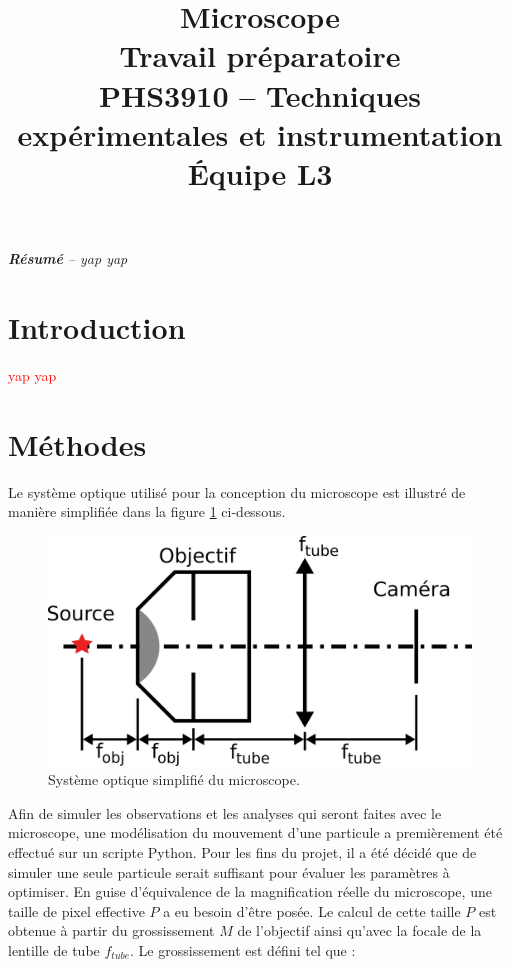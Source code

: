 \documentclass[conference]{IEEEtran}
\begin{document}
\title{Microscope\\
\large Travail préparatoire \\
PHS3910 -- Techniques expérimentales et instrumentation\\ 
Équipe L3}

\author{
\and
{}
\and
{}
\and
{}
}

\maketitle

\textit{\textbf{Résumé} -- yap yap}

\section{Introduction}


\textcolor{red}{yap yap}


\section{Méthodes \label{methodes}}
Le système optique utilisé pour la conception du microscope est illustré de manière simplifiée
dans la figure \ref{sys} ci-dessous.
\begin{figure}[H]
  \centering
  \includegraphics[scale=2.3]{systeme.png}
  \caption{Système optique simplifié du microscope.}
  \label{sys}
\end{figure}
Afin de simuler les observations et les analyses qui seront faites avec le microscope,
une modélisation du mouvement d'une particule a premièrement été effectué sur un scripte Python.
Pour les fins du projet, il a été décidé que de simuler une seule particule serait suffisant pour
évaluer les paramètres à optimiser. En guise d'équivalence de la magnification réelle du microscope, 
une taille de pixel effective $P$ a eu besoin d'être posée. Le calcul de cette taille $P$ est obtenue à partir du grossissement $M$ de l'objectif ainsi qu'avec la
focale de la lentille de tube $f_{tube}$. Le grossissement est défini tel que :
\end{document}
